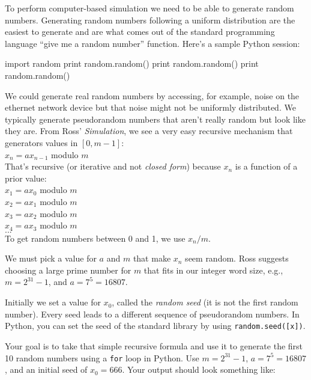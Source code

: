 \begin{fullwidth}

To perform computer-based simulation we need to be able to generate random numbers. Generating random numbers following a uniform distribution are the easiest to generate and are what comes out of the standard programming language ``give me a random number'' function.  Here's a sample Python session:

\begin{pyconsole}
import random
print random.random()
print random.random()
print random.random()
\end{pyconsole}

We could generate real random numbers by accessing, for example, noise on the ethernet network device but that noise might not be uniformly distributed. We typically generate pseudorandom numbers that aren't really random but look like they are. From Ross' {\em Simulation},  we see a very easy recursive mechanism that generators values in $[0,m-1]$:\\

$x_n = a x_{n-1}$ modulo $m$\\

That's recursive (or iterative and not {\em closed form}) because $x_n$ is a function of a prior value: \\

\noindent $x_1 = ax_0$ modulo $m$\\
$x_2 = ax_1$ modulo $m$\\
$x_3 = ax_2$ modulo $m$\\
$x_4 = ax_3$ modulo $m$\\
$...$\\

\noindent To get random numbers between 0 and 1, we use $x_n / m$.

We must pick a value for $a$ and $m$ that make $x_n$ seem random. Ross suggests choosing a large prime number for $m$ that fits in our integer word size, e.g., $m = 2^{31} - 1$, and $a = 7^5 = 16807$.

Initially we set a value for $x_0$, called the {\em random seed} (it is not the first random number). Every seed leads to a different sequence of pseudorandom numbers. In Python, you can set the seed of the standard library by using {\tt random.seed([x])}.

Your goal is to take that simple recursive formula and use it to generate the first 10 random numbers using a {\tt for} loop in Python. Use $m = 2^{31} - 1$, $a = 7^5 = 16807$, and an initial seed of $x_0 = 666$.  Your output should look something like:


\end{fullwidth}
